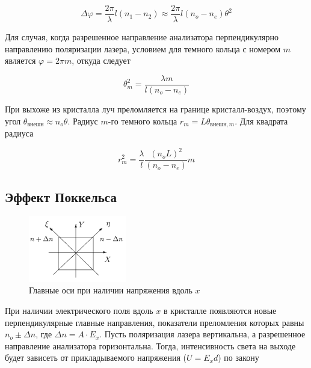 \documentclass{article}
\begin{document}
\begin{equation}
    \Delta \varphi = \frac{2\pi}{\lambda} l (n_1 - n_2) \approx
    \frac{2\pi}{\lambda} l (n_o - n_e) \theta^2
    \label{eq:raznost_faz}
\end{equation}

Для случая, когда разрешенное направление анализатора перпендикулярно направлению
поляризации лазера, условием для темного кольца с номером $m$ является
$\varphi = 2\pi m$, откуда следует

\begin{equation}
    \theta_m^2 = \frac{\lambda m}{l(n_o - n_e)}
    \label{eq:theta_m}
\end{equation}

При выхоже из кристалла луч преломляется на границе кристалл-воздух, поэтому угол
$\theta_{внешн} \approx n_o \theta$. Радиус $m$-го темного кольца
$r_m = L\theta_{внешн, m}$. Для квадрата радиуса

\begin{equation}
    r_m^2 = \frac{\lambda}{l} \frac{{(n_o L)}^2}{(n_o - n_e)} m
    \label{eq:r_m}
\end{equation}

\subsection{Эффект Поккельса}

\begin{figure}
  \begin{center}
    \includegraphics[width=0.38\textwidth]{pokkels_axes.png}
  \end{center}
  \caption{Главные оси при наличии напряжения вдоль $x$}\label{fig:pokkels_axes}
\end{figure}

При наличии электрического поля вдоль $x$ в кристалле появляются новые перпендикулярные
главные направления, показатели преломления которых равны $n_o \pm \Delta n$, где
$\Delta n = A \cdot E_{x}$. Пусть поляризация лазера вертикальна, а разрешенное
направление анализатора горизонтальна. Тогда, интенсивность света на выходе
будет зависеть от прикладываемого напряжения ($U = E_x d$) по закону
\end{document}
